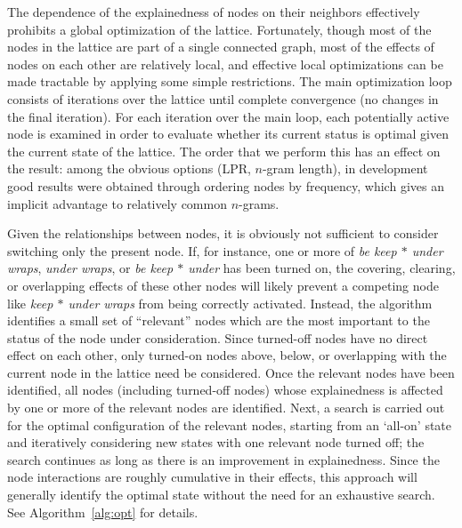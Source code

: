 \documentclass[11pt,letterpaper]{article}
\newcommand{\gap}{$*$\xspace}
\newcommand{\ex}[1]{\textit{#1}\xspace}
\newcommand{\algoref}[2][]{Algorithm#1~\ref{#2}\xspace}
\begin{document}
The dependence of the explainedness of nodes on their neighbors effectively prohibits a global optimization of the lattice. Fortunately, though most of the nodes in the lattice are part of a single connected graph, most of the effects of nodes on each other are relatively local, and effective local optimizations can be made tractable by applying some simple restrictions. The main optimization loop consists of iterations over the lattice until complete convergence (no changes in the final iteration). For each iteration over the main loop, each potentially active node is examined in order to evaluate whether its current status is optimal given the current state of the lattice. The order that we perform this has an effect on the result: among the obvious options (LPR, $n$-gram length), in development good results were obtained through ordering nodes by frequency, which gives an implicit advantage to relatively common $n$-grams.

Given the relationships between nodes, it is obviously not sufficient to consider switching only the present node. If, for instance, one or more of \ex{be keep \gap under wraps}, \ex{under wraps}, or \ex{be keep \gap under} has been turned on, the covering, clearing, or overlapping effects of these other nodes will likely prevent a competing node like \ex{keep \gap under wraps} from being correctly activated. Instead, the algorithm identifies a small set of ``relevant'' nodes which are the most important to the status of the node under consideration. Since turned-off nodes have no direct effect on each other, only turned-on nodes above, below, or overlapping with the current node in the lattice need be considered.  Once the relevant nodes have been identified, all nodes (including turned-off nodes) whose explainedness is affected by one or more of the relevant nodes are identified. Next, a search is carried out for the optimal configuration of the relevant nodes, starting from an `all-on' state and  iteratively considering new states with one relevant node turned off; the search continues as long as there is an improvement in explainedness. Since the node interactions are roughly cumulative in their effects, this approach will generally identify the optimal state without the need for an exhaustive search. See \algoref{alg:opt} for details.
\end{document}
